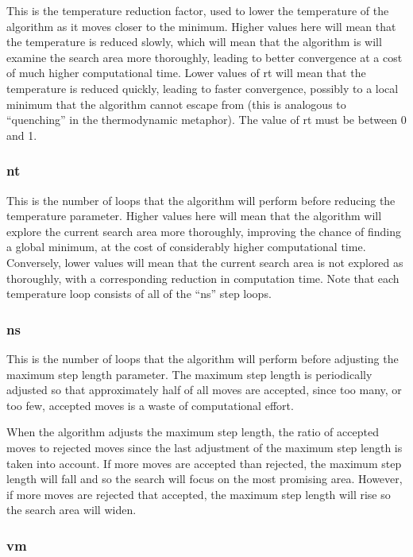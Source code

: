 \documentclass[]{book}
\begin{document}
This is the temperature reduction factor, used to lower the temperature
of the algorithm as it moves closer to the minimum. Higher values here
will mean that the temperature is reduced slowly, which will mean that
the algorithm is will examine the search area more thoroughly, leading
to better convergence at a cost of much higher computational time. Lower
values of rt will mean that the temperature is reduced quickly, leading
to faster convergence, possibly to a local minimum that the algorithm
cannot escape from (this is analogous to ``quenching'' in the
thermodynamic metaphor). The value of rt must be between 0 and 1.

\hypertarget{nt}{%
\subsubsection{nt}\label{nt}}

This is the number of loops that the algorithm will perform before
reducing the temperature parameter. Higher values here will mean that
the algorithm will explore the current search area more thoroughly,
improving the chance of finding a global minimum, at the cost of
considerably higher computational time. Conversely, lower values will
mean that the current search area is not explored as thoroughly, with a
corresponding reduction in computation time. Note that each temperature
loop consists of all of the ``ns'' step loops.

\hypertarget{ns}{%
\subsubsection{ns}\label{ns}}

This is the number of loops that the algorithm will perform before
adjusting the maximum step length parameter. The maximum step length is
periodically adjusted so that approximately half of all moves are
accepted, since too many, or too few, accepted moves is a waste of
computational effort.

When the algorithm adjusts the maximum step length, the ratio of
accepted moves to rejected moves since the last adjustment of the
maximum step length is taken into account. If more moves are accepted
than rejected, the maximum step length will fall and so the search will
focus on the most promising area. However, if more moves are rejected
that accepted, the maximum step length will rise so the search area will
widen.

\hypertarget{vm}{%
\subsubsection{vm}\label{vm}}
\end{document}
